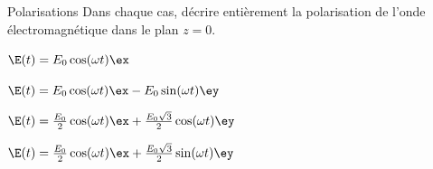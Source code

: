 \begin{exo}[PC][1][appli]{Polarisations}
  Dans chaque cas, décrire entièrement la polarisation de l'onde électromagnétique dans le plan $z=0$.

  \hauteurLargeurCadreReponse		{8mm}{8cm}
  \initialisationPartieGauche
  
    \begin{enonce}
      $\E(t) = E_0 \cos(\omega t) \ex$
    \end{enonce}
        
    \begin{enonce}
      $\E(t) = E_0 \cos(\omega t) \ex - E_0 \sin(\omega t) \ey$
    \end{enonce}
    
    \begin{enonce}
      $\E(t) = \frac{E_0}{2}\cos(\omega t) \ex + \frac{E_0 \sqrt{3}}{2} \cos(\omega t) \ey$
    \end{enonce}

    \begin{enonce}
      $\E(t) = \frac{E_0}{2}\cos(\omega t) \ex + \frac{E_0 \sqrt{3}}{2} \sin(\omega t) \ey$
    \end{enonce}

  \initialisationPartieDroite
  \finalisationDuPartageDePage 
\end{exo}

